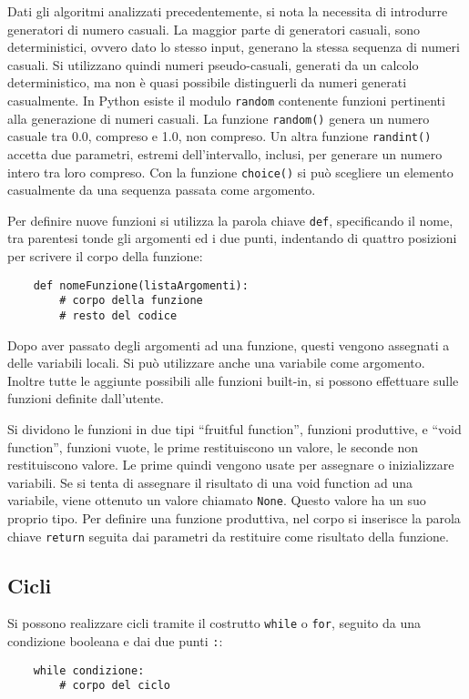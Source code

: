 \documentclass{article}
\numberwithin{equation}{subsection}
\begin{document}
Dati gli algoritmi analizzati precedentemente, si nota la necessita di introdurre generatori di numero casuali. La maggior parte di generatori casuali, sono deterministici, 
ovvero dato lo stesso input, generano la stessa sequenza di numeri casuali. Si utilizzano quindi numeri pseudo-casuali, generati da un calcolo deterministico, ma non è quasi possibile 
distinguerli da numeri generati casualmente. In Python esiste il modulo \verb|random| contenente funzioni pertinenti alla generazione di numeri casuali. La 
funzione \verb|random()| genera un numero casuale tra 0.0, compreso e 1.0, non compreso. Un altra funzione \verb|randint()| accetta due parametri, estremi 
dell'intervallo, inclusi, per generare un numero intero tra loro compreso. Con la funzione \verb|choice()| si può scegliere un elemento casualmente da una sequenza 
passata come argomento. 

Per definire nuove funzioni si utilizza la parola chiave \verb|def|, specificando il nome, tra parentesi tonde gli argomenti ed i due punti, indentando di quattro posizioni 
per scrivere il corpo della funzione:
\begin{verbatim}
    def nomeFunzione(listaArgomenti):
        # corpo della funzione
        # resto del codice
\end{verbatim}

Dopo aver passato degli argomenti ad una funzione, questi vengono assegnati a delle variabili locali. Si può utilizzare anche una variabile come argomento. Inoltre 
tutte le aggiunte possibili alle funzioni built-in, si possono effettuare sulle funzioni definite dall'utente. 

Si dividono le funzioni in due tipi ``fruitful function'', funzioni produttive, e ``void function'', funzioni vuote,  le prime restituiscono un valore, le seconde non restituiscono valore. Le prime quindi 
vengono usate per assegnare o inizializzare variabili. Se si tenta di assegnare il risultato di una void function ad una variabile, viene ottenuto un valore chiamato \verb|None|. 
Questo valore ha un suo proprio tipo. Per definire una funzione produttiva, nel corpo si inserisce la parola chiave \verb|return| seguita dai parametri da restituire come 
risultato della funzione. 

\subsection{Cicli}

Si possono realizzare cicli tramite il costrutto \verb|while| o \verb|for|, seguito da una condizione booleana e dai due punti \verb|:|:
\begin{verbatim}
    while condizione: 
        # corpo del ciclo
\end{verbatim}
\end{document}
